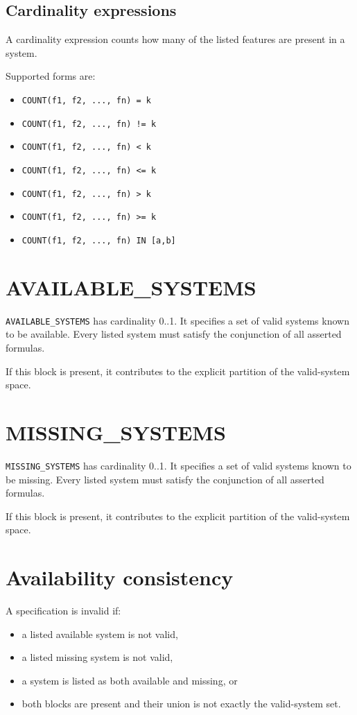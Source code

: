 \documentclass[english,10pt,a4paper,draft,onecolumn]{article}
\begin{document}
\subsection{Cardinality expressions}
A cardinality expression counts how many of the listed features are present in a system.

Supported forms are:
\begin{itemize}[leftmargin=*]
\item \texttt{COUNT(f1, f2, ..., fn) = k}
\item \texttt{COUNT(f1, f2, ..., fn) != k}
\item \texttt{COUNT(f1, f2, ..., fn) < k}
\item \texttt{COUNT(f1, f2, ..., fn) <= k}
\item \texttt{COUNT(f1, f2, ..., fn) > k}
\item \texttt{COUNT(f1, f2, ..., fn) >= k}
\item \texttt{COUNT(f1, f2, ..., fn) IN [a,b]}
\end{itemize}

\section{AVAILABLE\_SYSTEMS}
\texttt{AVAILABLE\_SYSTEMS} has cardinality 0..1. It specifies a set of valid systems known to be available. Every listed system must satisfy the conjunction of all asserted formulas.

If this block is present, it contributes to the explicit partition of the valid-system space.

\section{MISSING\_SYSTEMS}
\texttt{MISSING\_SYSTEMS} has cardinality 0..1. It specifies a set of valid systems known to be missing. Every listed system must satisfy the conjunction of all asserted formulas.

If this block is present, it contributes to the explicit partition of the valid-system space.

\section{Availability consistency}
A specification is invalid if:
\begin{itemize}[leftmargin=*]
\item a listed available system is not valid,
\item a listed missing system is not valid,
\item a system is listed as both available and missing, or
\item both blocks are present and their union is not exactly the valid-system set.
\end{itemize}
\end{document}
